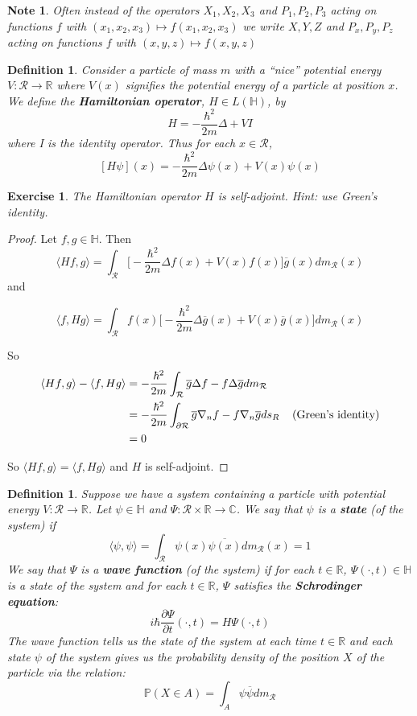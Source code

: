 \documentclass[12pt]{amsart}
\newtheorem{defn}[thm]{Definition}
\newtheorem{note}[thm]{Note}
\newtheorem{ex}[thm]{Exercise}
\renewcommand{\r}{\rangle}
\renewcommand{\l}{\langle}
\newcommand{\Del}{\Delta}
\newcommand{\C}{\mathbb{C}}
\renewcommand{\H}{\mathbb{H}}
\newcommand{\R}{\mathbb{R}}
\renewcommand{\P}{\mathbb{P}}
\renewcommand{\MR}{\mathcal{R}}
\begin{document}
\begin{note}
Often instead of the operators $X_1, X_2, X_3$ and $P_1, P_2, P_3$ acting on functions $f$ with $(x_1, x_2, x_3) \mapsto f(x_1, x_2, x_3)$ we write $X,Y,Z$ and $P_x,P_y,P_z$ acting on functions $f$ with $(x,y,z) \mapsto f(x,y,z)$
\end{note}

\begin{defn} 
Consider a particle of mass $m$ with a ``nice'' potential energy $V: \MR \rightarrow \R$ where $V(x)$ signifies the potential energy of a particle at position $x$. We define the \textbf{Hamiltonian operator}, $H \in L(\H)$, by $$H = -\frac{\hbar^2}{2m} \Delta+VI$$ where I is the identity operator. Thus for each $x \in \MR$, $$[H \psi](x) = -\frac{\hbar^2}{2m} \Delta\psi(x) +V(x)\psi(x)$$  
\end{defn} 

\begin{ex}
The Hamiltonian operator $H$ is self-adjoint. Hint: use Green's identity.
\end{ex}

\begin{proof} Let $f, g \in \H$. Then $$\l H f, g \r = \int_{\MR} \bigg[-\frac{\hbar^2}{2m} \Delta f(x) +V(x)f(x) \bigg] \overline{g}(x) dm_{\MR}(x)$$ and 

$$\l  f, Hg \r = \int_{\MR} f(x) \bigg[- \frac{\hbar^2}{2m} \Delta \overline{g}(x) +V(x)\overline{g}(x) \bigg]  dm_{\MR}(x)$$

So 
\begin{align*}
\l H f, g \r  - \l  f, Hg \r 
&= -\frac{\hbar^2}{2m} \int_{\MR} \overline{g} \Del f  - f \Del \overline{g}dm_{\MR}\\
&= - \frac{\hbar^2}{2m} \int_{\partial \MR} \overline{g}\nabla_{n}f - f \nabla_{n}\overline{g} ds_{R} \hspace {4mm}\text{(Green's identity)}\\
&= 0
\end{align*}

So $\l Hf, g \r = \l f, Hg\r$ and $H$ is self-adjoint.
\end{proof}

\begin{defn}
Suppose we have a system containing a particle with potential energy $V: \MR \rightarrow \R$. Let $\psi \in \H$ and $\Psi:\MR \times \R \rightarrow \C$. We say that $\psi$ is a \textbf{state} (of the system) if$$\l \psi, \psi \r = \int_{\MR} \psi(x) \overline{\psi(x)} dm_{\MR}(x) = 1$$ We say that $\Psi$ is a \textbf{wave function} (of the system) if for each $t \in \R$, $\Psi(\cdot, t) \in \H $ is a state of the system and for each $t \in \R$, $\Psi$ satisfies the \textbf{Schrodinger equation}: $$i\hbar \frac{\partial \Psi}{\partial t}(\cdot, t) = H\Psi(\cdot, t)$$ The wave function tells us the state of the system at each time $t \in \R$ and each state $\psi$ of the system gives us the probability density of the position $X$ of the particle via the relation: $$\P(X \in A) = \int_{A} \psi \overline{\psi} dm_{\MR}$$  
\end{defn}
\end{document}
